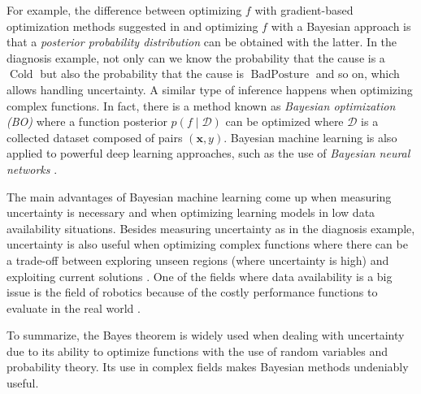 For example, the difference between optimizing $f$ with gradient-based optimization methods suggested in \textcite{bengio2000gradient} and optimizing $f$ with a Bayesian approach is that a \textit{posterior probability distribution} can be obtained with the latter. In the diagnosis example, not only can we know the probability that the cause is a $\operatorname{Cold}$ but also the probability that the cause is $\operatorname{BadPosture}$ and so on, which allows handling uncertainty. A similar type of inference happens when optimizing complex functions. In fact, there is a method known as \textit{Bayesian optimization (BO)} \parencite{shahriari2015taking} where a function posterior $p(f \mid \mathcal{D})$ can be optimized where $\mathcal{D}$ is a collected dataset composed of pairs $(\mathbf{x}, y)$. Bayesian machine learning is also applied to powerful deep learning approaches, such as the use of \textit{Bayesian neural networks} \parencite{jospin2022hands}. 

The main advantages of Bayesian machine learning come up when measuring uncertainty is necessary and when optimizing learning models in low data availability situations. Besides measuring uncertainty as in the diagnosis example, uncertainty is also useful when optimizing complex functions where there can be a trade-off between exploring unseen regions (where uncertainty is high) and exploiting current solutions \parencite{Luke2013Metaheuristics}. One of the fields where data availability is a big issue is the field of robotics because of the costly performance functions to evaluate in the real world \parencite{shahriari2015taking}. 

To summarize, the Bayes theorem is widely used when dealing with uncertainty due to its ability to optimize functions with the use of random variables and probability theory. Its use in complex fields makes Bayesian methods undeniably useful.












\printbibliography




